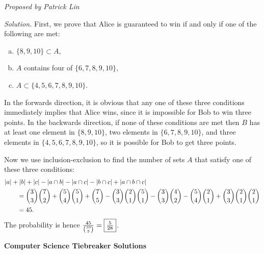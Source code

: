\documentclass[10pt]{article}
\newcounter{enum}
\newcommand{\proposed}[1]
{
\vspace{5pt}
\noindent\textit{Proposed by #1}
}
\newcommand{\solution}
{
\vspace{5pt}
\noindent\textit{Solution.}\qquad
}
\DeclarePairedDelimiter\abs{\lvert}{\rvert}
\begin{document}
\begin{enumerate}
\proposed{Patrick Lin}

\solution First, we prove that Alice is guaranteed to win if and only if one of the following are met:
\begin{enumerate}[(a)]
\item $\{8,9,10\} \subset A$,
\item $A$ contains four of $\{6,7,8,9,10\}$,
\item $A \subset \{4,5,6,7,8,9,10\}$.
\end{enumerate}
In the forwards direction, it is obvious that any one of these three conditions immediately implies that Alice wins, since it is impossible for Bob to win three points. In the backwards direction, if none of these conditions are met then $B$ has at least one element in $\{8,9,10\}$, two elements in $\{6,7,8,9,10\}$, and three elements in $\{4,5,6,7,8,9,10\}$, so it is possible for Bob to get three points.

\par Now we use inclusion-exclusion to find the number of sets $A$ that satisfy one of these three conditions:
\begin{align*}
& \abs{a} + \abs{b} + \abs{c} - \abs{a \cap b} - \abs{a \cap c} - \abs{b \cap c} + \abs{a \cap b \cap c} \\
& \qquad = \binom33\binom72 + \binom54\binom51 + \binom75 - \binom33\binom21\binom51 - \binom33\binom42 - \binom54\binom21 + \binom33\binom21\binom21 \\
& \qquad = 45.
\end{align*}
The probability is hence $\frac{45}{\binom{10}{5}} = \text{\fbox{$\frac{5}{28}$}}$.

\end{enumerate}


\begin{center}
\huge\textbf{Computer Science Tiebreaker Solutions}
\end{center}
\end{document}
